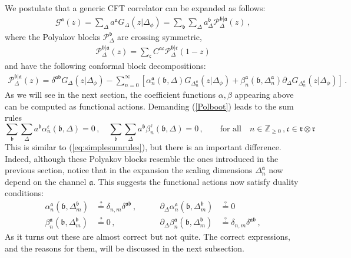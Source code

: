 \documentclass[12pt]{article}
\numberwithin{equation}{section}
\newcommand{\reef}[1]{(\ref{#1})}
\newcommand{\bea}{\begin{eqnarray}}
\newcommand{\eea}{\end{eqnarray}}
\newcommand{\ba}{\begin{equation}\begin{aligned}}
\newcommand{\ea}{\end{aligned}\end{equation}}
\newcommand{\Df}{{\Delta_\phi}}
\newcommand{\mf}[1]{\mathfrak #1}
\begin{document}
	We postulate that a generic CFT correlator can be expanded as follows:
	\bea\label{Polboot}
	\mathcal G^{\mf a}(z)=\sum_{\Delta} a^{\mf a} G_{\Delta}(z|\Df)=\sum_{\mf b}\sum_{\Delta} a^{\mf b}_{\Delta} \mathcal P^{\mf b| \mf a}_\Delta(z)\,,
	\eea
	where the Polyakov blocks $\mathcal P^{\mf b}_{\Delta}$ are crossing symmetric,
	\bea
	\mathcal P^{\mf b|\mf a}_\Delta(z)=\sum_{\mf c} C^{\mf a \mf c} 	\mathcal P^{\mf b|\mf c}_\Delta(1-z)
	\eea
	and have the following conformal block decompositions:
	\bea
	\mathcal P^{\mf b| \mf a}_{\Delta}(z)=\delta^{\mf a \mf b} G_{\Delta}(z|\Df)-\sum_{n=0}^{\infty}\left[\alpha_n^{\mf a}(\mf b,\Delta) G_{\Delta_n^{\mf a}}(z|\Df)+\beta_n^{\mf a}(\mf b,\Delta_n^{\mf a}) \partial_{\Delta} G_{\Delta_n^{\mf a}}(z|\Df)\right]\,. \label{eq:polydecomposition}
	\eea
	As we will see in the next section, the coefficient functions $\alpha,\beta$ appearing above can be computed as functional actions.
	 Demanding \reef{Polboot} leads to the sum rules
	\begin{equation}
		\boxed{
			\sum_{\mf b}\sum_{\Delta} a^{\mf b}\alpha_n^{\mf c}(\mf b,\Delta)=0\,, \quad \sum_{\mf b}\sum_{\Delta} a^{\mf b} \beta_n^{\mf c}(\mf b,\Delta)=0\,, \qquad \mbox{for all}\quad n\in \mathbb Z_{\geq 0}\,, \mf c\in \mf r \otimes \mf r} \label{eq:gffsumrules}
	\end{equation}
	 This is similar to \reef{eq:simplesumrules}, but there is an important difference. Indeed, although these Polyakov blocks resemble the ones introduced in the previous section, notice that  in the expansion the scaling dimensions $\Delta_n^{\mf a}$ now depend on the channel $\mf a$. This suggests the functional actions now satisfy duality conditions:
	\ba\label{ortho}
	\alpha_n^{\mf a}(\mf b,\Delta_m^{\mf b})&\overset{?}{=}\delta_{n,m} \delta^{\mf a \mf b}\,,& \qquad \partial_{\Delta} \alpha_n^{\mf a}(\mf b,\Delta_m^{\mf b})&\overset{?}{=}0\\
	\beta_n^{\mf a}(\mf b,\Delta_m^{\mf b})&\overset{?}{=}0\,,& \qquad \partial_{\Delta} \beta_n^{\mf a}(\mf b,\Delta_m^{\mf b})&\overset{?}{=}\delta_{n,m} \delta^{\mf a \mf b}\,,
	\ea
	As it turns out these are almost correct but not quite. The correct expressions, and the reasons for them, will be discussed in the next subsection. 
	
\end{document}
